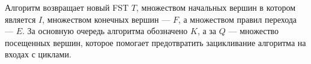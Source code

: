 Алгоритм возвращает новый FST $T$, множеством начальных вершин в котором является $I$, множеством конечных вершин — $F$, а множеством правил перехода — $E$. За основную очередь алгоритма обозначено $K$, а за $Q$ — множество посещенных вершин, которое помогает предотвратить зацикливание алгоритма на входах с циклами.

